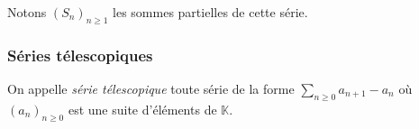 \documentclass[a4paper,10pt]{report}
\newcommand{\Sum}[2]{\ensuremath{\textstyle{\sum\limits_{#1}^{#2}}}}
\newcommand{\Int}[2]{\ensuremath{\mathchoice%
	{{\displaystyle\int_{#1}^{#2}}}
	{{\displaystyle\int_{#1}^{#2}}}
	{\int_{#1}^{#2}}
	{\int_{#1}^{#2}}
	}}
\begin{document}
\noindent Notons $(S_n)_{n \geq 1}$ les sommes partielles de cette série.

\newpage

\subsubsection{Séries télescopiques}

\noindent On appelle \textit{série télescopique} toute série de la forme $\Sum{n\geq 0}{} a_{n+1}-a_n$ où $(a_n)_{n \geq 0}$ est une suite d'éléments de $\mathbb{K}$.
\end{document}
